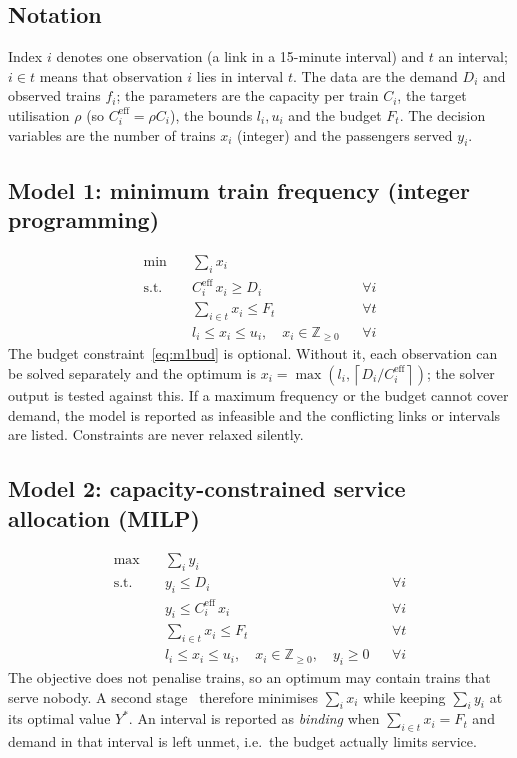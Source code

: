 \documentclass[conference]{IEEEtran}
\newcommand{\Ceff}{C^{\mathrm{eff}}}
\begin{document}
\subsection{Notation}
Index $i$ denotes one observation (a link in a 15-minute interval) and $t$ an interval; $i \in t$ means that
observation $i$ lies in interval $t$. The data are the demand $D_i$ and observed trains $f_i$; the parameters are the
capacity per train $C_i$, the target utilisation $\rho$ (so $\Ceff_i = \rho C_i$), the bounds $l_i, u_i$ and the
budget $F_t$. The decision variables are the number of trains $x_i$ (integer) and the passengers served $y_i$.

\subsection{Model 1: minimum train frequency (integer programming)}
\begin{align}
\min \quad & \sum_i x_i \label{eq:m1obj}\\
\text{s.t.} \quad & \Ceff_i\, x_i \ge D_i && \forall i \label{eq:m1cap}\\
& \sum_{i \in t} x_i \le F_t && \forall t \label{eq:m1bud}\\
& l_i \le x_i \le u_i, \quad x_i \in \mathbb{Z}_{\ge 0} && \forall i
\end{align}
The budget constraint~\eqref{eq:m1bud} is optional. Without it, each observation can be solved separately and the
optimum is $x_i = \max\left(l_i, \left\lceil D_i / \Ceff_i \right\rceil\right)$; the solver output is tested against
this. If a maximum frequency or the budget cannot cover demand, the model
is reported as infeasible and the conflicting links or intervals are listed. Constraints are never relaxed silently.

\subsection{Model 2: capacity-constrained service allocation (MILP)}
\begin{align}
\max \quad & \sum_i y_i \\
\text{s.t.} \quad & y_i \le D_i && \forall i \\
& y_i \le \Ceff_i\, x_i && \forall i \\
& \sum_{i \in t} x_i \le F_t && \forall t \\
& l_i \le x_i \le u_i, \quad x_i \in \mathbb{Z}_{\ge 0}, \quad y_i \ge 0 && \forall i
\end{align}
The objective does not penalise trains, so an optimum may contain trains that serve nobody. A second
stage~\cite{williams2013} therefore minimises $\sum_i x_i$ while keeping $\sum_i y_i$ at its optimal value $Y^*$. An interval is reported as \emph{binding} when $\sum_{i\in t}x_i = F_t$ and demand in that interval is left unmet, i.e.\ the budget actually limits service.
\end{document}

